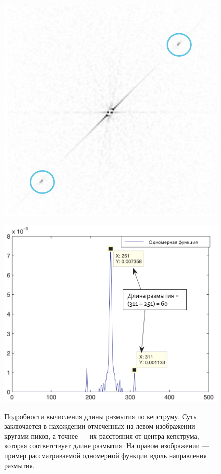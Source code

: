 \begin{figure}[H]
\begin{minipage}[h]{0.45\linewidth}
\includegraphics[width=1\linewidth, right]{pics/len/cep_inverted.png} \\ 
\end{minipage}
\hfill
\begin{minipage}[h]{0.45\linewidth}
\includegraphics[width=1\linewidth, left]{pics/len/oned.PNG} \\ 
\end{minipage}
 
\caption{Подробности вычисления длины размытия по кепструму. Суть заключается в нахождении отмеченных на левом изображении кругами пиков, а точнее --- их расстояния от центра кепструма, которая соответствует длине размытия. На правом изображении --- пример рассматриваемой одномерной функции вдоль направления размытия.}
\label{ris:len_est_ex}
\end{figure}


